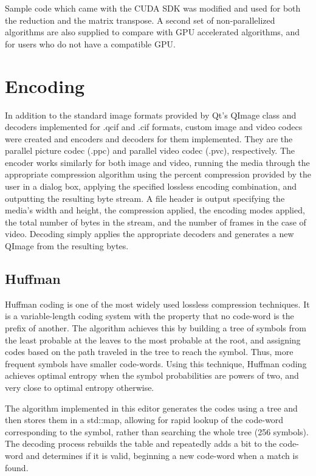 \documentclass[10pt,twocolumn,twoside]{IEEEtran}
\begin{document}
Sample code which came with the CUDA SDK was modified and used for both the reduction and the matrix transpose. A second set of non-parallelized algorithms are also supplied to compare with GPU accelerated algorithms, and for users who do not have a compatible GPU.

\section{Encoding}
In addition to the standard image formats provided by Qt's QImage class and decoders implemented for .qcif and .cif formats, custom image and video codecs were created and encoders and decoders for them implemented. They are the parallel picture codec (.ppc) and parallel video codec (.pvc), respectively. The encoder works similarly for both image and video, running the media through the appropriate compression algorithm using the percent compression provided by the user in a dialog box, applying the specified lossless encoding combination, and outputting the resulting byte stream. A file header is output specifying the media's width and height, the compression applied, the encoding modes applied, the total number of bytes in the stream, and the number of frames in the case of video. Decoding simply applies the appropriate decoders and generates a new QImage from the resulting bytes.

\subsection{Huffman}
Huffman coding is one of the most widely used lossless compression techniques. It is a variable-length coding system with the property that no code-word is the prefix of another. The algorithm achieves this by building a tree of symbols from the least probable at the leaves to the most probable at the root, and assigning codes based on the path traveled in the tree to reach the symbol. Thus, more frequent symbols have smaller code-words. Using this technique, Huffman coding achieves optimal entropy when the symbol probabilities are powers of two, and very close to optimal entropy otherwise.

The algorithm implemented in this editor generates the codes using a tree and then stores them in a std::map, allowing for rapid lookup of the code-word corresponding to the symbol, rather than searching the whole tree (256 symbols). The decoding process rebuilds the table and repeatedly adds a bit to the code-word and determines if it is valid, beginning a new code-word when a match is found. 
\end{document}
